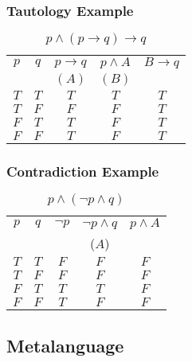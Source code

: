 \documentclass[dvipsnames]{beamer}
\begin{document}
\begin{frame}
  \frametitle{Tautology Example}

  \begin{example}
    \begin{table}
      \caption{$p \wedge (p \rightarrow q) \rightarrow q$}
      \begin{tabular}{|c|c|c|c||c|}\hline
        $p$ & $q$ & $p \rightarrow q$ & $p \wedge A$ & $B \rightarrow q$\\
            &     & $(A)$             & $(B)$        &\\\hline\hline
        $T$ & $T$ & $T$ & $T$ & $T$\\\hline
        $T$ & $F$ & $F$ & $F$ & $T$\\\hline
        $F$ & $T$ & $T$ & $F$ & $T$\\\hline
        $F$ & $F$ & $T$ & $F$ & $T$\\\hline
      \end{tabular}
    \end{table}
  \end{example}
\end{frame}

\begin{frame}
  \frametitle{Contradiction Example}

  \begin{example}
    \begin{table}
      \caption{$p \wedge (\neg p \wedge q)$}
      \begin{tabular}{|c|c|c|c||c|}\hline
        $p$ & $q$ & $\neg p$ & $\neg p \wedge q$ & $p \wedge A$\\
            &     &          & ($A$)             &\\\hline\hline
        $T$ & $T$ & $F$ & $F$ & $F$\\\hline
        $T$ & $F$ & $F$ & $F$ & $F$\\\hline
        $F$ & $T$ & $T$ & $T$ & $F$\\\hline
        $F$ & $F$ & $T$ & $F$ & $F$\\\hline
      \end{tabular}
    \end{table}
  \end{example}
\end{frame}

\subsection{Metalanguage}
\end{document}
